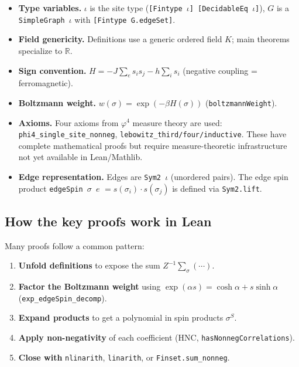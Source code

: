 \documentclass[a4paper,11pt]{article}
\begin{document}
\begin{itemize}
  \item \textbf{Type variables.} $\iota$ is the site type
    (\texttt{[Fintype $\iota$] [DecidableEq $\iota$]}), $G$ is a
    \texttt{SimpleGraph $\iota$} with \texttt{[Fintype G.edgeSet]}.
  \item \textbf{Field genericity.} Definitions use a generic ordered
    field $K$; main theorems specialize to $\mathbb{R}$.
  \item \textbf{Sign convention.} $H = -J\sum_e s_i s_j - h\sum_i s_i$
    (negative coupling = ferromagnetic).
  \item \textbf{Boltzmann weight.} $w(\sigma) = \exp(-\beta H(\sigma))$
    (\texttt{boltzmannWeight}).
  \item \textbf{Axioms.} Four axioms from $\varphi^4$ measure theory
    are used: \texttt{phi4\_single\_\allowbreak site\_nonneg},
    \texttt{lebowitz\_\allowbreak third/\allowbreak four/\allowbreak inductive}.
    These have complete mathematical proofs but require measure-theoretic
    infrastructure not yet available in Lean/Mathlib.
  \item \textbf{Edge representation.} Edges are \texttt{Sym2 $\iota$}
    (unordered pairs). The edge spin product
    \texttt{edgeSpin $\sigma$ $e$} $= s(\sigma_i) \cdot s(\sigma_j)$
    is defined via \texttt{Sym2.lift}.
\end{itemize}

\subsection{How the key proofs work in Lean}

Many proofs follow a common pattern:
\begin{enumerate}
  \item \textbf{Unfold definitions} to expose the sum
    $Z^{-1} \sum_\sigma (\cdots)$.
  \item \textbf{Factor the Boltzmann weight} using
    $\exp(\alpha s) = \cosh\alpha + s\sinh\alpha$
    (\texttt{exp\_edgeSpin\_decomp}).
  \item \textbf{Expand products} to get a polynomial in spin products
    $\sigma^S$.
  \item \textbf{Apply non-negativity} of each coefficient
    (HNC, \texttt{hasNonnegCorrelations}).
  \item \textbf{Close with} \texttt{nlinarith}, \texttt{linarith},
    or \texttt{Finset.sum\_nonneg}.
\end{enumerate}
\end{document}
